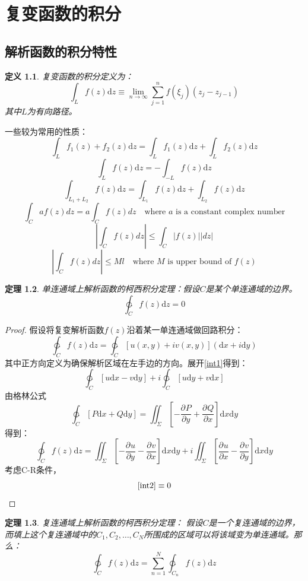 \documentclass[10pt, a4paper, oneside]{ctexbook}
\newtheorem{theorem}{定理}[section]
\newtheorem{definition}[theorem]{定义}
\def\D{\mathrm{d}}
\def\Fex{\ensuremath{u(x,y)+iv(x,y)}}
\newcommand{\partdev}[3][]
{\ensuremath{\frac{\displaystyle \partial^{#1} #2}{ \displaystyle \partial #3}}}
\newcommand{\F}[1][z]
{\ensuremath{f(#1)}}
\begin{document}
\chapter{ 复变函数的积分}

\section{解析函数的积分特性}

\begin{definition}
    复变函数的积分定义为：
    $$\int_L f(z) \D z \equiv \lim_{n\to\infty}\sum_{j=1}^n f(\xi_j)(z_j-z_{j-1})$$
    其中$L$为有向路径。
\end{definition}
一些较为常用的性质：
$$\int_L f_1(z)+f_2(z)\D z=\int_L f_1(z)\D z+\int_L f_2(z)\D z$$
$$\int_L f(z)\D z = -\int_{-L} f(z)\D z$$
$$\int_{L_1+L_2} f(z)\D z = \int_{L_1} f(z)\D z+\int_{L_2} f(z)\D z$$
$$\int_{C} a f(z) d z=a \int_{C} f(z) d z \quad \text{where $a$ is a constant complex number}$$ 
\begin{equation*}
\left|\int_{C} f(z) d z\right| \leq \int_{C}|f(z)||d z|
\end{equation*}
$$\left|\int_{C} f(z) d z\right| \leq M l \quad \text{where $M$ is upper bound of $f(z)$}$$
\begin{theorem}
    单连通域上解析函数的柯西积分定理：假设$C$是某个单连通域的边界。
    $$\ointctrclockwise_C \F \D z = 0$$
\end{theorem}
\begin{proof}
    假设将复变解析函数$\F$沿着某一单连通域做回路积分：
\begin{equation}
    \label{int1}
    \ointctrclockwise_C \F \D z = \ointctrclockwise_C \left[\Fex\right](\D x + i \D y)
\end{equation}
其中正方向定义为确保解析区域在左手边的方向。展开\ref{int1}得到：
$$\ointctrclockwise_C \left[u\D x- v\D y\right] + i \ointctrclockwise_C \left[u\D y+ v\D x\right]$$
由格林公式
$$\ointctrclockwise_C \left[P\D x+ Q\D y\right] = \iint_\Sigma \left[-\partdev{P}{y}+\partdev{Q}{x}\right]\D x\D y$$
得到：
\begin{equation}
    \label{int2}
    \ointctrclockwise_C \F \D z=  \iint_\Sigma \left[-\partdev{u}{y}-\partdev{v}{x}\right]\D x\D y+i\iint_{\Sigma} \left[\partdev{u}{x}-\partdev{v}{y}\right]\D x\D y
\end{equation}
考虑{\rm C-R}条件，
$$\ref{int2}\equiv 0$$
\end{proof}
\begin{theorem}
    \label{cit2}
    复连通域上解析函数的柯西积分定理：
    假设$C$是一个复连通域的边界，而填上这个复连通域中的$C_1,C_2,\dots,C_N$所围成的区域可以将该域变为单连通域。那么：
    $$ \ointctrclockwise_C \F \D z= \sum_{n=1}^N \ointctrclockwise_{C_n} \F \D z$$
\end{theorem}
\end{document}
